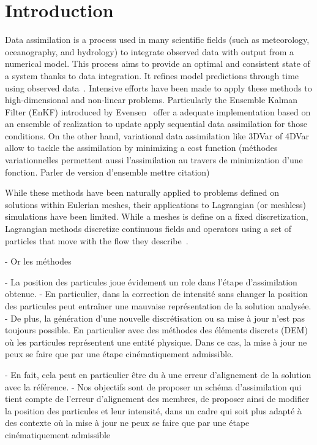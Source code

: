 
\section{Introduction}

Data assimilation is a process used in many scientific fields (such as meteorology, oceanography, and hydrology) to integrate observed data with output from a numerical model. This process aims to provide an optimal and consistent state of a system thanks to data integration. It refines model predictions through time using observed data~\cite{bocquet_introduction_2014}. Intensive efforts have been made to apply these methods to high-dimensional and non-linear problems. Particularly the Ensemble Kalman Filter (EnKF) introduced by Evensen~\cite{evensen_sequential_1994} offer a adequate implementation based on an ensemble of realization to update apply sequential data assimilation for those conditions. On the other hand, variational data assimilation like 3DVar of 4DVar allow to tackle the assimilation by minimizing a cost function  (méthodes variationnelles permettent aussi l'assimilation au travers de minimization d'une fonction. Parler de version d'ensemble mettre citation)

While these methods have been naturally applied to problems defined on solutions within Eulerian meshes, their applications to Lagrangian (or meshless) simulations have been limited. While a meshes is define on a fixed discretization, Lagrangian methods discretize continuous fields and operators using a set of particles that move with the flow they describe~\cite{s_li_meshfree_2004}.

- Or les méthodes



- La position des particules joue évidement un role dans l'étape d'assimilation obtenue.
- En particulier, dans  la correction de intensité sans changer la position des particules peut entraîner une mauvaise représentation de la solution analysée.
- De plus, la génération d'une nouvelle discrétisation ou sa mise à jour n'est pas toujours possible. En particulier avec des méthodes des éléments discrets (DEM) où les particules représentent une entité physique. Dans ce cas, la mise à jour ne peux se faire que par une étape cinématiquement admissible.

- En fait, cela peut en particulier être du à une erreur d'alignement de la solution avec la référence.
- Nos objectifs sont de proposer un schéma d'assimilation qui tient compte de l’erreur d’alignement des membres, de proposer ainsi de modifier la position des particules et leur intensité, dans un cadre qui soit plus adapté à des contexte où la mise à jour ne peux se faire que par une étape cinématiquement admissible


